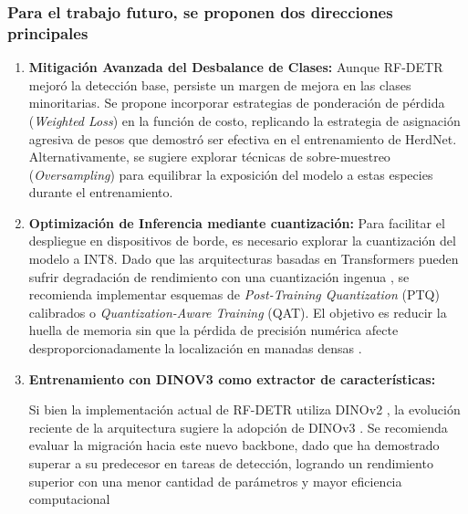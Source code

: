 \subsubsection*{Para el trabajo futuro, se proponen dos direcciones principales}

\begin{enumerate}
    \item \textbf{Mitigación Avanzada del Desbalance de Clases:}
    Aunque RF-DETR mejoró la detección base, persiste un margen de mejora en las clases minoritarias. Se propone incorporar estrategias de ponderación de pérdida (\textit{Weighted Loss}) en la función de costo, replicando la estrategia de asignación agresiva de pesos que demostró ser efectiva en el entrenamiento de HerdNet. Alternativamente, se sugiere explorar técnicas de sobre-muestreo (\textit{Oversampling}) para equilibrar la exposición del modelo a estas especies durante el entrenamiento.

    \item \textbf{Optimización de Inferencia mediante cuantización:}
    Para facilitar el despliegue en dispositivos de borde, es necesario explorar la cuantización del modelo a INT8. Dado que las arquitecturas basadas en Transformers pueden sufrir degradación de rendimiento con una cuantización ingenua \cite{rf-detr}, se recomienda implementar esquemas de \textit{Post-Training Quantization} (PTQ) calibrados \cite{fima-q} o \textit{Quantization-Aware Training} (QAT). El objetivo es reducir la huella de memoria sin que la pérdida de precisión numérica afecte desproporcionadamente la localización en manadas densas \cite{hqod}.

    \item \textbf{Entrenamiento con DINOV3 como extractor de características:}

    Si bien la implementación actual de RF-DETR utiliza DINOv2 \cite{dinov2}, la evolución reciente de la arquitectura sugiere la adopción de DINOv3 \cite{dinov3}. Se recomienda evaluar la migración hacia este nuevo backbone, dado que ha demostrado superar a su predecesor en tareas de detección, logrando un rendimiento superior con una menor cantidad de parámetros y mayor eficiencia computacional \cite{deimv2}
\end{enumerate}
